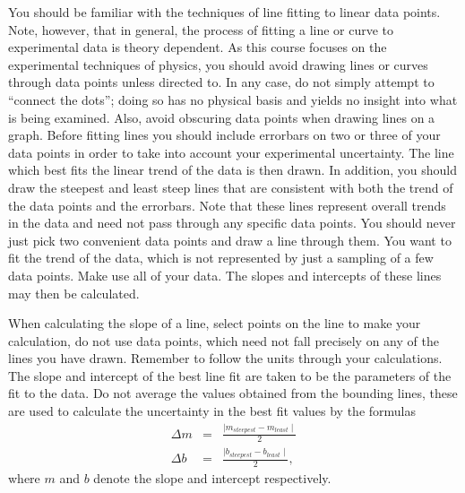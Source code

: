 You should be familiar with the techniques of line fitting to linear data 
points.  Note, however, that in general,  the process of fitting a line or 
curve to experimental data is theory dependent.  As this course focuses on the
experimental techniques of physics, you should avoid drawing lines or curves
through data points unless directed to.  In any case,  do not simply attempt 
to ``connect the dots'';  doing so has no physical basis and yields no insight
into  what is being examined.  Also, avoid obscuring data points when drawing
lines on a graph.  Before fitting lines you should include errorbars on two or 
three of your data points in order to take into account your experimental 
uncertainty.  The line which best fits the linear trend of the data is then 
drawn.  In addition,  you should draw the steepest and least steep lines that 
are consistent with both the trend of the data points and the errorbars.  Note 
that these lines represent overall trends in the data and need not pass 
through any specific data points. You should never just pick two convenient 
data points and draw a line through them. You want to fit the trend of the 
data, which is not represented by just a sampling of a few data points. Make 
use all of your data. The slopes and intercepts of these lines may then be 
calculated.  

When calculating the slope of a line,  select points on the line to make your 
calculation,  do not use data points, which need not fall precisely on any of 
the lines you have drawn.  Remember to follow the units through your 
calculations. The slope and intercept of the best line fit are taken to be the 
parameters of the fit to the data. Do not average the values obtained from the 
bounding lines,  these are used to calculate the uncertainty in the best fit 
values by the formulas
\begin{eqnarray}
\Delta m &=& \frac{\mid m_{steepest} - m_{least} \mid}{2} \\
\Delta b &=& \frac{\mid b_{steepest} - b_{least} \mid}{2},
\end{eqnarray}  
where $m$ and $b$ denote the slope and intercept respectively. 

